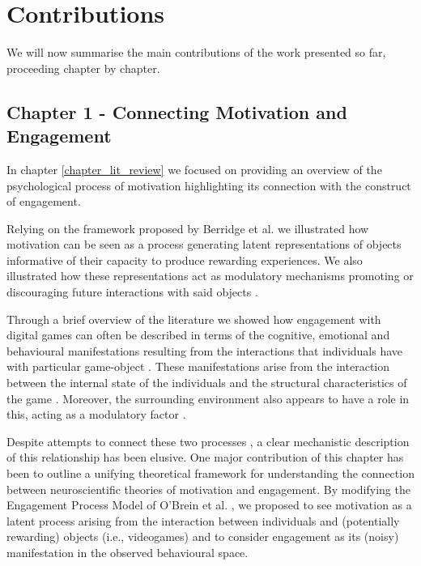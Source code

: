 \section{Contributions}

We will now summarise the main contributions of the work presented so far, proceeding chapter by chapter.

\subsection{Chapter 1 - Connecting Motivation and Engagement}
\label{discussion_chapter_one}
In chapter \ref{chapter_lit_review} we focused on providing an overview of the psychological process of motivation highlighting its connection with the construct of engagement.

Relying on the framework proposed by Berridge et al. \cite{berridge1998role} we illustrated how motivation can be seen as a process generating latent representations of objects informative of their capacity to produce rewarding experiences. We also illustrated how these representations act as modulatory mechanisms promoting or discouraging future interactions with said objects \cite{berridge2004motivation}.

Through a brief overview of the literature we showed how engagement with digital games can often be described in terms of the cognitive, emotional and behavioural manifestations resulting from the interactions that individuals have with particular game-object \cite{boyle2012engagement, jennett2008measuring, przybylski2010motivational}. These manifestations arise from the interaction between the internal state of the individuals and the structural characteristics of the game \cite{lucas2004sex,o2008user,jennett2008measuring,boyle2012engagement,connolly2012systematic,csikszentmihalyi2014toward}. Moreover, the surrounding environment also appears to have a role in this, acting as a modulatory factor \cite{o2008user, bialas2014cultural, vihanga2019weekly, zendle2022transnational}.

Despite attempts to connect these two processes \cite{przybylski2010motivational, nacke2011brainhex, deterding2022mastering}, a clear mechanistic description of this relationship has been elusive. One major contribution of this chapter has been to outline a unifying theoretical framework for understanding the connection between neuroscientific theories of motivation and engagement. By modifying the Engagement Process Model of O'Brein et al. \cite{o2008user}, we proposed to see motivation as a latent process arising from the interaction between individuals and (potentially rewarding) objects (i.e., videogames) and to consider engagement as its (noisy) manifestation in the observed behavioural space. 

